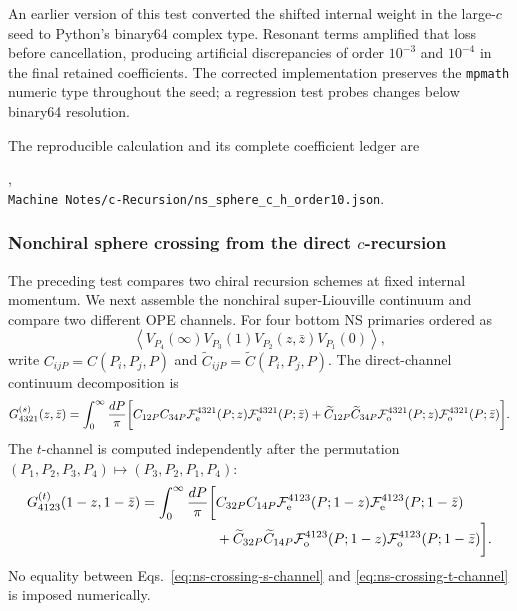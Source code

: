 \documentclass[11pt]{article}
\newcommand{\F}{\mathcal F}
\begin{document}
An earlier version of this test converted the shifted internal weight in the
large-\(c\) seed to Python's binary64 complex type.  Resonant terms amplified
that loss before cancellation, producing artificial discrepancies of order
\(10^{-3}\) and \(10^{-4}\) in the final retained coefficients.  The corrected
implementation preserves the \texttt{mpmath} numeric type throughout the seed;
a regression test probes changes below binary64 resolution.

The reproducible calculation and its complete coefficient ledger are
\begin{center}
 ,\\
 \texttt{Machine Notes/c-Recursion/ns\_sphere\_c\_h\_order10.json}.
\end{center}

\subsubsection{Nonchiral sphere crossing from the direct \texorpdfstring{\(c\)}{c}-recursion}
\label{sec:ns-sphere-direct-c-crossing}

The preceding test compares two chiral recursion schemes at fixed internal
momentum.  We next assemble the nonchiral super-Liouville continuum and
compare two different OPE channels.  For four bottom NS primaries ordered as
\begin{equation}
 \left\langle
 V_{P_4}(\infty)V_{P_3}(1)V_{P_2}(z,\bar z)V_{P_1}(0)
 \right\rangle,
 \label{eq:ns-crossing-ordered-correlator}
\end{equation}
write \(C_{ijP}=C(P_i,P_j,P)\) and
\(\widetilde C_{ijP}=\widetilde C(P_i,P_j,P)\).  The direct-channel
continuum decomposition is
\begin{align}
 G_{4321}^{(s)}(z,\bar z)
 =\int_0^\infty\frac{dP}{\pi}\bigg[
  C_{12P}C_{34P}
  \F_{\rm e}^{4321}(P;z)\F_{\rm e}^{4321}(P;\bar z)
  +\widetilde C_{12P}\widetilde C_{34P}
  \F_{\rm o}^{4321}(P;z)\F_{\rm o}^{4321}(P;\bar z)
 \bigg].
 \label{eq:ns-crossing-s-channel}
\end{align}
The \(t\)-channel is computed independently after the permutation
\((P_1,P_2,P_3,P_4)\mapsto(P_3,P_2,P_1,P_4)\):
\begin{align}
 G_{4123}^{(t)}(1-z,1-\bar z)
 =\int_0^\infty\frac{dP}{\pi}\bigg[&
  C_{32P}C_{14P}
  \F_{\rm e}^{4123}(P;1-z)\F_{\rm e}^{4123}(P;1-\bar z)
  \nonumber\\[-0.2em]
  &+\widetilde C_{32P}\widetilde C_{14P}
  \F_{\rm o}^{4123}(P;1-z)\F_{\rm o}^{4123}(P;1-\bar z)
 \bigg].
 \label{eq:ns-crossing-t-channel}
\end{align}
No equality between Eqs.~\eqref{eq:ns-crossing-s-channel} and
\eqref{eq:ns-crossing-t-channel} is imposed numerically.
\end{document}
